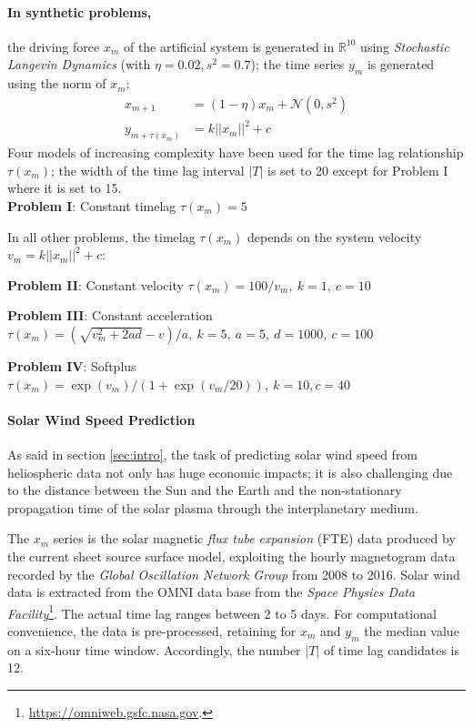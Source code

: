 
\paragraph{In synthetic problems,} the driving force $x_m$ of the artificial system is generated in $\mathbb{R}^{10}$ using \emph{Stochastic Langevin Dynamics} (with $\eta = 0.02, s^2 = 0.7$); the time series $y_m$ is generated using the norm of $x_m$: 
\begin{align}
 x_{m+1} &= (1 - \eta) x_m + \mathcal{N}(0, s^2) \label{eq:data}\\
 y_{m+\tau(x_m)} &= k ||x_m||^2 + c \label{eq:outputs}
\end{align}
Four models of increasing complexity have been used for the time lag relationship $\tau(x_m)$; the width of the time lag interval $|T|$ is set to 20 except for Problem I where it is set to 15.\\

{\bf Problem I}: Constant timelag $\tau(x_m) = 5$

In all other problems, the timelag $\tau(x_m)$ depends on the system velocity $v_m = k ||x_m||^2 + c$: 

{\bf Problem II}: Constant velocity $\tau(x_m) = 100/v_m,\ k = 1,\ c = 10$

{\bf Problem III}: Constant acceleration $\tau(x_m) = (\sqrt{v_m^2 + 2ad} - v)/a,\ k = 5,\ a = 5,\ d = 1000, \ c = 100$

{\bf Problem IV}: Softplus $\tau(x_m) = \exp\left(v_m\right)/\left(1 + \exp(v_m/20)\right), \ k = 10, c = 40$

\paragraph{Solar Wind Speed Prediction}\label{sec:solarwind}
As said in section \ref{sec:intro}, the task of predicting solar wind speed from heliospheric data not only 
has huge economic impacts; it is also challenging due to the distance between the Sun and the Earth and the non-stationary propagation time of the solar plasma through the interplanetary medium. 

The $x_m$ series is the solar magnetic \emph{flux tube expansion} (FTE) data produced by the {current sheet source surface} \citep{csss} model, exploiting the hourly magnetogram data recorded by the \emph{Global Oscillation Network Group} from 2008 to 2016.
Solar wind data is extracted from the OMNI data base from the \emph{Space Physics Data Facility}\footnote{\url{https://omniweb.gsfc.nasa.gov}.}. The actual time lag ranges between 2 to 5 days. For computational convenience, the data is pre-processed, retaining for $x_m$ and $y_m$ the median value on a six-hour time window. Accordingly, the number $|T|$ of time lag candidates is 12.  

